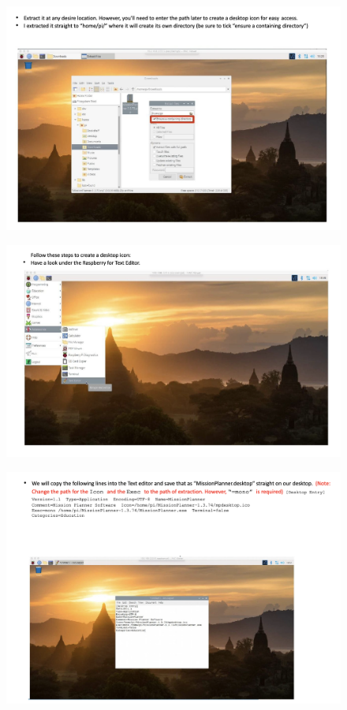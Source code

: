 \begin{figure}[h!]
\centering
\includegraphics[width=\columnwidth]{./Figures/config_img13.png}
\end{figure}

\begin{figure}[h!]
\centering
\includegraphics[width=\columnwidth]{./Figures/config_img14.png}
\end{figure}

\begin{figure}[h!]
\centering
\includegraphics[width=\columnwidth]{./Figures/config_img15.png}
\end{figure}

